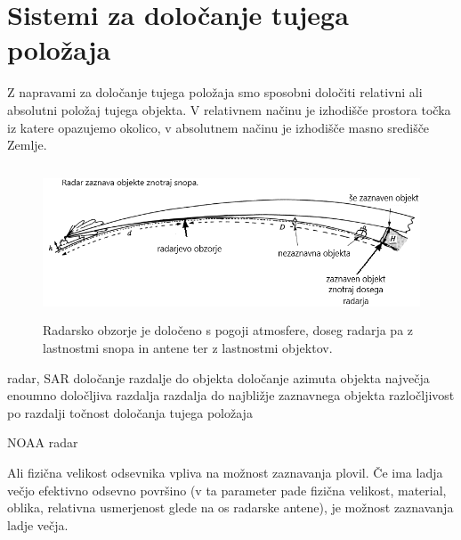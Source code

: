 %
\chapter{Sistemi za določanje tujega položaja}
\label{Ch_Radar} %

Z napravami za določanje tujega položaja smo sposobni določiti relativni ali absolutni položaj tujega objekta. V relativnem načinu je izhodišče prostora točka iz katere opazujemo okolico, v absolutnem načinu je izhodišče masno središče Zemlje.

\begin{figure}
	\centering
	\includegraphics[height=4.5cm]{Predavanja/06_DolocTujegaPolozaja/figs/RadarjevoObzorjeInDoseg.png}
	\caption{Radarsko obzorje je določeno s pogoji atmosfere, doseg radarja pa z lastnostmi snopa in antene ter z lastnostmi objektov.}
	\label{fig:RadarObzorjeDoseg}       %
\end{figure} 
%


radar, SAR
določanje razdalje do objekta
določanje azimuta objekta
največja enoumno določljiva razdalja
razdalja do najbližje zaznavnega objekta
razločljivost po razdalji
točnost določanja tujega položaja

NOAA radar

Ali fizična velikost odsevnika vpliva na možnost zaznavanja plovil.
Če ima ladja večjo efektivno odsevno površino (v ta parameter pade fizična velikost, material, oblika, relativna usmerjenost glede na os radarske antene), je možnost zaznavanja ladje večja.


